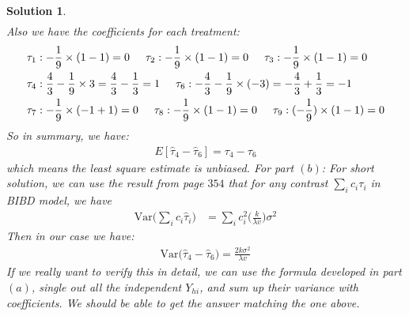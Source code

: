 \documentclass[11pt]{article}
\newtheorem{sol}{Solution}
\begin{document}
\begin{sol}
\begin{align*}
  \end{align*}
  Also we have the coefficients for each treatment:
  \begin{align*}
  	&\tau_1: -\frac{1}{9} \times (1 - 1) = 0 \hskip 5mm \tau_2: -\frac{1}{9} \times (1 - 1) = 0 \hskip 5mm \tau_3: -\frac{1}{9} \times (1 - 1) =0 \\
  	&\tau_4: \frac{4}{3} - \frac{1}{9} \times 3 = \frac{4}{3} - \frac{1}{3} = 1\hskip 5mm \tau_6: -\frac{4}{3} - \frac{1}{9} \times (-3) = -\frac{4}{3} + \frac{1}{3} = -1\\
  	&\tau_7: -\frac{1}{9} \times (-1 + 1) = 0 \hskip 5mm \tau_8: -\frac{1}{9} \times (1 - 1) = 0 \hskip 5mm \tau_9: (-\frac{1}{9})\times (1 - 1) = 0
  \end{align*}
  So in summary, we have:
  \begin{align*}
  	E[\hat{\tau}_4 - \hat{\tau}_6] = \tau_4 - \tau_6
  \end{align*}
  which means the least square estimate is unbiased.\vskip 2mm
  For part $(b)$:\vskip 2mm
  For short solution, we can use the result from page $354$ that for any contrast $\sum_i c_i\tau_i$ in BIBD model, we have
  \begin{align*}
  	\text{Var}\Big(\sum_i c_i\hat{\tau}_i\Big) &= \sum_i c_i^2\Big(\frac{k}{\lambda v}\Big)\sigma^2
  \end{align*}
  Then in our case we have:
  \begin{align*}
  	\text{Var}\Big(\hat{\tau}_4 - \hat{\tau}_6\Big) = \frac{2k\sigma^2}{\lambda v}
  \end{align*}
  If we really want to verify this in detail, we can use the formula developed in part $(a)$, single out all the independent $Y_{hi}$, and sum up their variance with coefficients. We should be able to get the answer matching the one above.
\end{sol}
\end{document}
